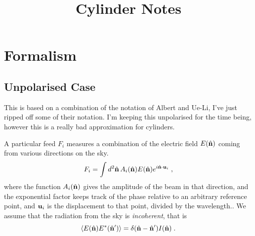 \documentclass{revtex4}
\begin{document}
\title{Cylinder Notes}

\maketitle



\section{Formalism}

\subsection{Unpolarised Case}

This is based on a combination of the notation of Albert and Ue-Li, I've just
ripped off some of their notation. I'm keeping this unpolarised for the time
being, however this is a really bad approximation for cylinders.

A particular feed $F_i$ measures a combination of the electric field $E(\hat{\mathbf{n}})$
coming from various directions on the sky.
\begin{equation}
F_i = \int d^2\hat{\mathbf{n}} \, A_i(\hat{\mathbf{n}}) E(\hat{\mathbf{n}}) e^{i \hat{\mathbf{n}}\cdot\mathbf{u}_i}\; ,
\end{equation}
where the function $A_i(\hat{\mathbf{n}})$ gives the amplitude of the beam in that
direction, and the exponential factor keeps track of the phase relative to an
arbitrary reference point, and $\mathbf{u}_i$ is the displacement to that point,
divided by the wavelength.. We assume that the radiation from the sky is
\emph{incoherent}, that is
\begin{equation}
\left\langle E(\hat{\mathbf{n}}) E^* (\hat{\mathbf{n}}') \right\rangle = \delta(\hat{\mathbf{n}} - \hat{\mathbf{n}}') I(\hat{\mathbf{n}}) \; .
\end{equation}
\end{document}
